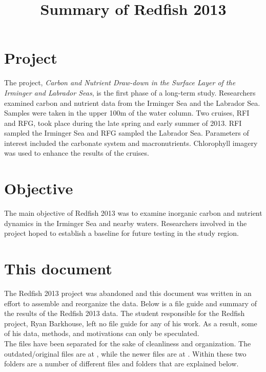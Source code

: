 \documentclass[journal, a4paper]{article} %
\title{Summary of Redfish 2013}
\author{}
\begin{document}
\section{Project}

The project, \textit{Carbon and Nutrient Draw-down in the Surface Layer of the Irminger and Labrador Seas}, is the first phase of a long-term study. Researchers examined carbon and nutrient data from the Irminger Sea and the Labrador Sea. Samples were taken in the upper 100m of the water column. Two cruises, RFI and RFG, took place during the late spring and early summer of 2013. RFI sampled the Irminger Sea and RFG sampled the Labrador Sea. Parameters of interest included the carbonate system and macronutrients. Chlorophyll imagery was used to enhance the results of the cruises. 
 

\section{Objective}


The main objective of Redfish 2013 was to examine inorganic carbon and nutrient dynamics in the Irminger Sea and nearby waters. Researchers involved in the project hoped to establish a baseline for future testing in the study region.


 
\section{This document}



The Redfish 2013 project was abandoned and this document was written in an effort to assemble and reorganize the data. Below is a file guide and summary of the results of the Redfish 2013 data. The student responsible for the Redfish project, Ryan Barkhouse, left no file guide for any of his work. As a result, some of his data, methods, and motivations can only be speculated. 
\\[12pt]
The files have been separated for the sake of cleanliness and organization. The outdated/original files are at , while the newer files are at . Within these two folders are a number of different files and folders that are explained below. 
\newpage
\end{document}
